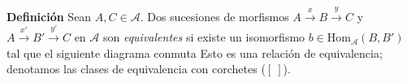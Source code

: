 \documentclass[preview]{standalone}
\begin{document}
\begin{center}
\flushleft \textbf{Definición} Sean $A,C\in\mathscr{A}$. Dos sucesiones de morfismos $A\xrightarrow{x}B\xrightarrow{y}C$ y $A\xrightarrow{x'}B'\xrightarrow{y'}C$ en $\mathscr{A}$ son \emph{equivalentes} si existe un isomorfismo $b\in\text{Hom}_\mathscr{A}(B,B')$ tal que el siguiente diagrama conmuta \break \vspace{5mm}Esto es una relación de equivalencia; denotamos las clases de equivalencia con corchetes ($[ \ ]$).
\end{center}
\end{document}
